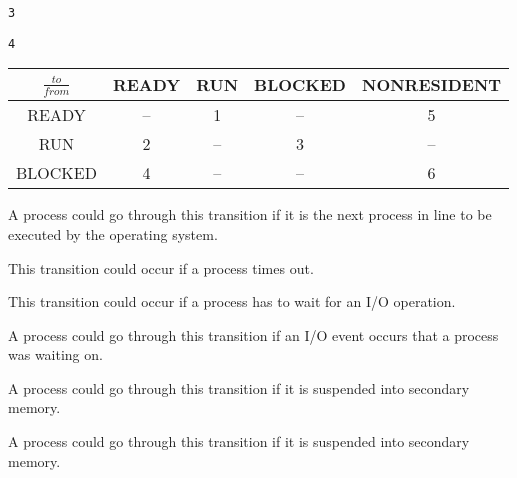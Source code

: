 \documentclass[11pt,largemargins]{homework}
\begin{document}
\begin{alphaparts}

    \texttt{3}


    \texttt{4}

\end{alphaparts}
\clearpage


\begin{tabular}{|c|c|c|c|c|}\hline %
    $\tfrac{to}{from}$ & \textbf{READY} & \textbf{RUN} & \textbf{BLOCKED} &
    \textbf{NONRESIDENT}
    \\\hline %
    READY              & --             & 1            & --               & 5
    \\\hline %
    RUN                & 2              & --           & 3                & --
    \\\hline %
    BLOCKED            & 4              & --           & --               & 6
    \\\hline %
\end{tabular}

\begin{arabicparts}

    A process could go through this transition if it is the next process in
    line to be executed by the operating system.


    This transition could occur if a process times out.


    This transition could occur if a process has to wait for an I/O
    operation.


    A process could go through this transition if an I/O event occurs that
    a process was waiting on.


    A process could go through this transition if it is suspended into
    secondary memory.


    A process could go through this transition if it is suspended into
    secondary memory.
\end{arabicparts}
\clearpage
\end{document}
